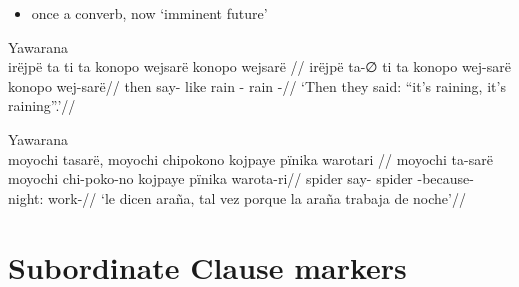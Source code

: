 \documentclass{memoir}
\begin{document}
\begin{itemize}
\tightlist
\item
  once a converb, now `imminent future'
\end{itemize}

\ex Yawarana \\
\label{ctorat-25}    \begingl
    \glpreamble irëjpë ta ti ta konopo wejsarë konopo wejsarë //
    \gla irëjpë ta-∅ ti ta konopo wej-sarë konopo wej-sarë//
    \glb then say-  like rain - rain -//
        \glft ‘Then they said: “it’s raining, it’s raining”.’//  
    \endgl 
\xe

\ex Yawarana \\
\label{ctoaragrme-25}    \begingl
    \glpreamble moyochi tasarë, moyochi chipokono kojpaye pïnika warotari //
    \gla moyochi ta-sarë moyochi chi-poko-no kojpaye pïnika warota-ri//
    \glb spider say- spider -because- night:  work-//
        \glft ‘le dicen araña, tal vez porque la araña trabaja de noche’//  
    \endgl 
\xe

\section{Subordinate Clause markers}

\end{document}
